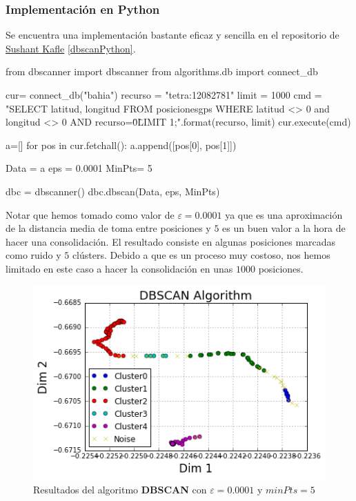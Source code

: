\documentclass[a4paper, 12pt]{article}
\begin{document}
\subsubsection{Implementaci\'on en Python}

Se encuentra una implementaci\'on bastante eficaz y sencilla en el repositorio de \href{https://github.com/SushantKafle/DBSCAN}{Sushant Kafle} \ref{dbscanPython}.\\

\begin{python}
from dbscanner import dbscanner
from algorithms.db import connect_db

cur= connect_db("bahia")
recurso = "tetra:12082781"
limit = 1000
cmd = "SELECT latitud, longitud 
	   FROM posicionesgps 
	   WHERE latitud <> 0 and longitud <> 0 
	   AND recurso=\"{0}\" 
	   LIMIT {1};".format(recurso, limit)
cur.execute(cmd)

a=[]
for pos in cur.fetchall():
    a.append([pos[0], pos[1]])

Data = a
eps = 0.0001
MinPts= 5

dbc = dbscanner()
dbc.dbscan(Data, eps, MinPts)
\end{python}

Notar que hemos tomado como valor de $\varepsilon = 0.0001$ ya que es una aproximaci\'on de la distancia media de toma entre posiciones y $5$ es un buen valor a la hora de hacer una consolidaci\'on. El resultado consiste en algunas posiciones marcadas como ruido y $5$ cl\'usters. Debido a que es un proceso muy costoso, nos hemos limitado en este caso a hacer la consolidaci\'on en unas $1000$ posiciones.\\

\begin{figure}[!htbp]
	\begin{center}
	\includegraphics[scale=.7]{dbscan_2_0.png}
	\end{center}
	\caption{Resultados del algoritmo \textbf{DBSCAN} con $\varepsilon = 0.0001$ y $minPts = 5$}
\end{figure}
\end{document}
